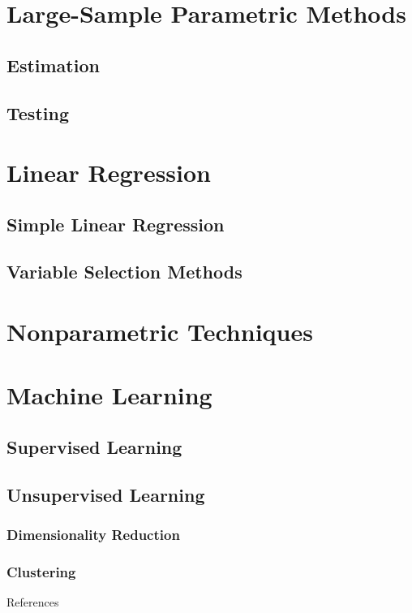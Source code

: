\documentclass{beamer}
\begin{document}
 \section{Large-Sample Parametric Methods}
 
 \subsection{Estimation}
 
 \subsection{Testing}


\section{Linear Regression}

\subsection{Simple Linear Regression}

\subsection{Variable Selection Methods}

\section{Nonparametric Techniques}


\section{Machine Learning}
\subsection{Supervised Learning}

\subsection{Unsupervised Learning}
\subsubsection{Dimensionality Reduction}
\subsubsection{Clustering}



\begin{frame}[allowframebreaks]{References}

\end{frame}
\end{document}
